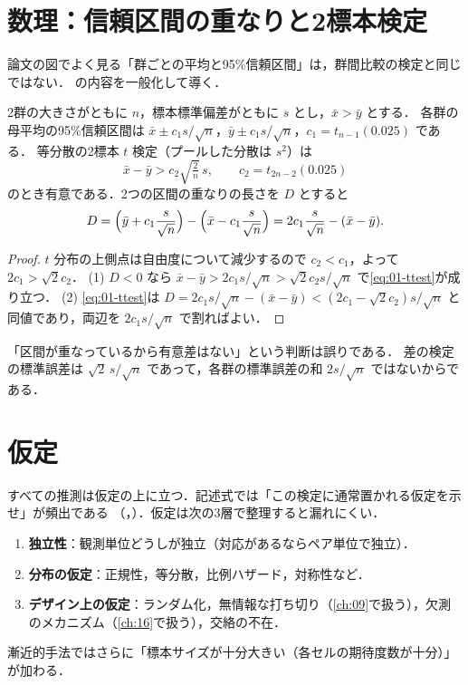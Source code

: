 \section{数理：信頼区間の重なりと2標本検定}\label{sec:01-overlap}
\Hinshutsu 論文の図でよく見る「群ごとの平均と95\%信頼区間」は，群間比較の検定と同じではない．
 の内容を一般化して導く．

2群の大きさがともに $n$，標本標準偏差がともに $s$ とし，$\bar x>\bar y$ とする．
各群の母平均の95\%信頼区間は $\bar x\pm c_1 s/\sqrt n$，$\bar y\pm c_1 s/\sqrt n$，$c_1=t_{n-1}(0.025)$ である．
等分散の2標本 $t$ 検定（プールした分散は $s^2$）は
\begin{equation}
\bar x-\bar y>c_2\sqrt{\tfrac{2}{n}}\,s,\qquad c_2=t_{2n-2}(0.025)\label{eq:01-ttest}
\end{equation}
のとき有意である．2つの区間の重なりの長さを $D$ とすると
\[
D=\Bigl(\bar y+c_1\frac{s}{\sqrt n}\Bigr)-\Bigl(\bar x-c_1\frac{s}{\sqrt n}\Bigr)=2c_1\frac{s}{\sqrt n}-(\bar x-\bar y).
\]
\begin{proof}
$t$ 分布の上側点は自由度について減少するので $c_2<c_1$，よって $2c_1>\sqrt2 c_2$．
(1) $D<0$ なら $\bar x-\bar y>2c_1 s/\sqrt n>\sqrt2 c_2 s/\sqrt n$ で\cref{eq:01-ttest}が成り立つ．
(2) \cref{eq:01-ttest}は $D=2c_1s/\sqrt n-(\bar x-\bar y)<(2c_1-\sqrt2c_2)s/\sqrt n$ と同値であり，両辺を $2c_1s/\sqrt n$ で割ればよい．
\end{proof}
「区間が重なっているから有意差はない」という判断は誤りである．
差の検定の標準誤差は $\sqrt2\,s/\sqrt n$ であって，各群の標準誤差の和 $2s/\sqrt n$ ではないからである．

\section{仮定}\label{sec:01-assump}
すべての推測は仮定の上に立つ．記述式では「この検定に通常置かれる仮定を示せ」が頻出である
（，）．仮定は次の3層で整理すると漏れにくい．
\begin{enumerate}
\item \textbf{独立性}：観測単位どうしが独立（対応があるならペア単位で独立）．
\item \textbf{分布の仮定}：正規性，等分散，比例ハザード，対称性など．
\item \textbf{デザイン上の仮定}：ランダム化，無情報な打ち切り（\cref{ch:09}で扱う），欠測のメカニズム（\cref{ch:16}で扱う），交絡の不在．
\end{enumerate}
漸近的手法ではさらに「標本サイズが十分大きい（各セルの期待度数が十分）」が加わる．


